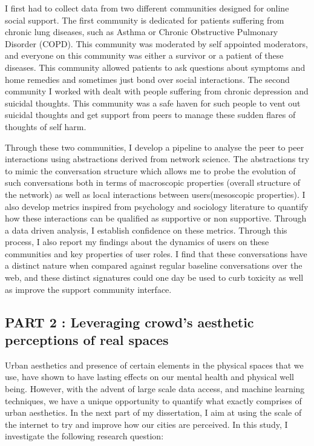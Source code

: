 I first had to collect data from two different communities designed for online social support. The first community is dedicated for patients suffering from chronic lung diseases, such as Asthma or Chronic Obstructive Pulmonary Disorder (COPD). This community was moderated by self appointed moderators, and everyone on this community was either a survivor or a patient of these diseases. This community allowed patients to ask questions about symptoms and home remedies and sometimes just bond over social interactions. The second community I worked with dealt with people suffering from chronic depression and suicidal thoughts. This community was a safe haven for such people to vent out suicidal thoughts and get support from peers to manage these sudden flares of thoughts of self harm. 

Through these two communities, I develop a pipeline to analyse the peer to peer interactions using abstractions derived from network science. The abstractions try to mimic the conversation structure which allows me to probe the evolution of such conversations both in terms of macroscopic properties (overall structure of the network) as well as local interactions between users(mesoscopic properties). I also develop metrics inspired from psychology and sociology literature to quantify how these interactions can be qualified as supportive or non supportive. Through a data driven analysis, I establish confidence on these metrics. Through this process, I also report my findings about the dynamics of users on these communities and key properties of user roles. I find that these conversations have a distinct nature when compared against regular baseline conversations over the web, and these distinct signatures could one day be used to curb toxicity as well as improve the support community interface.

\subsection{PART 2 : Leveraging crowd's aesthetic perceptions of real spaces}
Urban aesthetics and presence of certain elements in the physical spaces that we use, have shown to have lasting effects on our mental health\cite{seresinhe2017using} and physical well being\cite{ball2001perceived,giles2005increasing}. However, with the advent of large scale data access, and machine learning techniques, we have a unique opportunity to quantify what exactly comprises of urban aesthetics.
In the next part of my dissertation, I aim at using the scale of the internet to try and improve how our cities are perceived. In this study, I investigate the following research question: 


